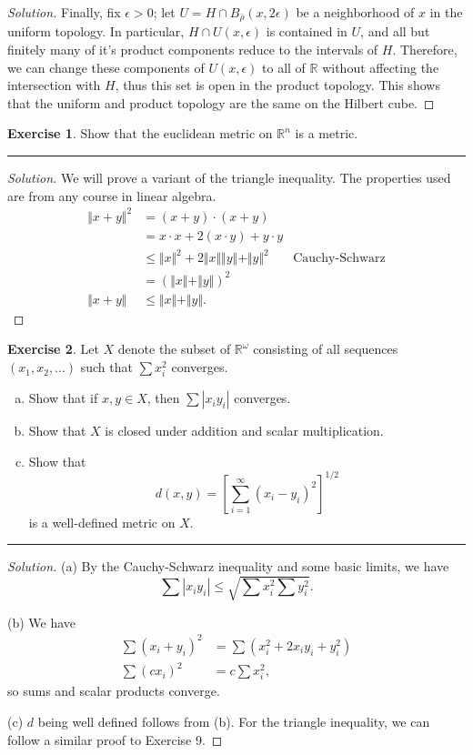 \documentclass{article}
\theoremstyle{definition}
\newtheorem{exercise}{Exercise}[section]
\begin{document}
\begin{proof}[Solution]
  Finally, fix $\epsilon > 0$; let $U = H\cap B_{\bar{\rho}}(x,2\epsilon)$ be a neighborhood of $x$ in the uniform topology. In particular, $H\cap U(x,\epsilon)$ is contained in $U$, and all but finitely many of it's product components reduce to the intervals of $H$. Therefore, we can change these components of $U(x,\epsilon)$ to all of $\mathbb{R}$ without affecting the intersection with $H$, thus this set is open in the product topology. This shows that the uniform and product topology are the same on the Hilbert cube.
\end{proof}

\pagebreak

\begin{exercise}
  Show that the euclidean metric on $\mathbb{R}^n$ is a metric.
\end{exercise}
\hrule
\begin{proof}[Solution]
  We will prove a variant of the triangle inequality. The properties used are from any course in linear algebra.
  \begin{align*}
    \Vert x + y \Vert^2 &= (x+y)\cdot(x+y) \\
    &= x\cdot x + 2(x\cdot y) + y\cdot y \\
    &\le \Vert x\Vert^2 + 2\Vert x\Vert\Vert y\Vert + \Vert y\Vert^2 & \text{Cauchy-Schwarz} \\
    &= (\Vert x\Vert + \Vert y\Vert)^2 \\
    \Vert x + y \Vert &\le \Vert x\Vert + \Vert y\Vert.
  \end{align*}
\end{proof}

\pagebreak

\begin{exercise}
  Let $X$ denote the subset of $\mathbb{R}^\omega$ consisting of all sequences $(x_1,x_2,\dots)$ such that $\sum x_i^2$ converges.
  \begin{enumerate}[(a)]
    \item Show that if $x,y\in X$, then $\sum |x_iy_i|$ converges.
    \item Show that $X$ is closed under addition and scalar multiplication.
    \item Show that
    $$d(x,y) = \left[\sum_{i=1}^{\infty} (x_i - y_i)^2\right]^{1/2}$$
    is a well-defined metric on $X$.
  \end{enumerate}
\end{exercise}
\hrule
\begin{proof}[Solution]
  (a) By the Cauchy-Schwarz inequality and some basic limits, we have $$\sum |x_iy_i| \le \sqrt{\sum x_i^2 \sum y_i^2}.$$
  
  (b) We have
  \begin{align*}
    \sum (x_i + y_i)^2 &= \sum (x_i^2 + 2x_iy_i + y_i^2) \\
    \sum (cx_i)^2 &= c\sum x_i^2,
  \end{align*}
  so sums and scalar products converge.

  (c) $d$ being well defined follows from (b). For the triangle inequality, we can follow a similar proof to Exercise 9.
\end{proof}
\end{document}
